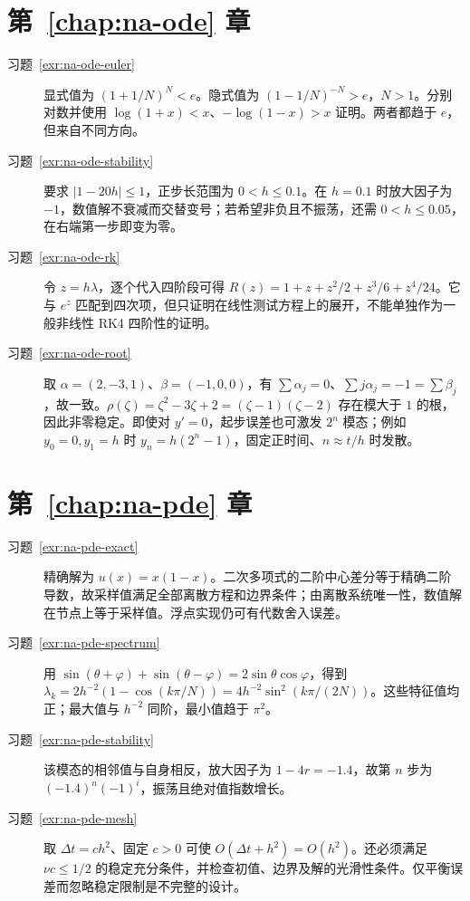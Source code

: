 \documentclass[UTF8,12pt,a4paper,fontset=fandol]{ctexbook}
\begin{document}
\section{第~\ref{chap:na-ode} 章}
\begin{description}
\item[习题~\ref{exr:na-ode-euler}] 显式值为 $(1+1/N)^N<e$。隐式值为 $(1-1/N)^{-N}>e$，$N>1$。分别对数并使用 $\log(1+x)<x$、$-\log(1-x)>x$ 证明。两者都趋于 $e$，但来自不同方向。
\item[习题~\ref{exr:na-ode-stability}] 要求 $|1-20h|\le1$，正步长范围为 $0<h\le0.1$。在 $h=0.1$ 时放大因子为 $-1$，数值解不衰减而交替变号；若希望非负且不振荡，还需 $0<h\le0.05$，在右端第一步即变为零。
\item[习题~\ref{exr:na-ode-rk}] 令 $z=h\lambda$，逐个代入四阶段可得 $R(z)=1+z+z^2/2+z^3/6+z^4/24$。它与 $e^z$ 匹配到四次项，但只证明在线性测试方程上的展开，不能单独作为一般非线性 RK4 四阶性的证明。
\item[习题~\ref{exr:na-ode-root}] 取 $\alpha=(2,-3,1)$、$\beta=(-1,0,0)$，有 $\sum\alpha_j=0$、$\sum j\alpha_j=-1=\sum\beta_j$，故一致。$\rho(\zeta)=\zeta^2-3\zeta+2=(\zeta-1)(\zeta-2)$ 存在模大于 $1$ 的根，因此非零稳定。即使对 $y'=0$，起步误差也可激发 $2^n$ 模态；例如 $y_0=0,y_1=h$ 时 $y_n=h(2^n-1)$，固定正时间、$n\approx t/h$ 时发散。
\end{description}

\section{第~\ref{chap:na-pde} 章}
\begin{description}
\item[习题~\ref{exr:na-pde-exact}] 精确解为 $u(x)=x(1-x)$。二次多项式的二阶中心差分等于精确二阶导数，故采样值满足全部离散方程和边界条件；由离散系统唯一性，数值解在节点上等于采样值。浮点实现仍可有代数舍入误差。
\item[习题~\ref{exr:na-pde-spectrum}] 用 $\sin(\theta+\varphi)+\sin(\theta-\varphi)=2\sin\theta\cos\varphi$，得到 $\lambda_k=2h^{-2}(1-\cos(k\pi/N))=4h^{-2}\sin^2(k\pi/(2N))$。这些特征值均正；最大值与 $h^{-2}$ 同阶，最小值趋于 $\pi^2$。
\item[习题~\ref{exr:na-pde-stability}] 该模态的相邻值与自身相反，放大因子为 $1-4r=-1.4$，故第 $n$ 步为 $(-1.4)^n(-1)^i$，振荡且绝对值指数增长。
\item[习题~\ref{exr:na-pde-mesh}] 取 $\Delta t=ch^2$、固定 $c>0$ 可使 $O(\Delta t+h^2)=O(h^2)$。还必须满足 $\nu c\le1/2$ 的稳定充分条件，并检查初值、边界及解的光滑性条件。仅平衡误差而忽略稳定限制是不完整的设计。
\end{description}
\end{document}

